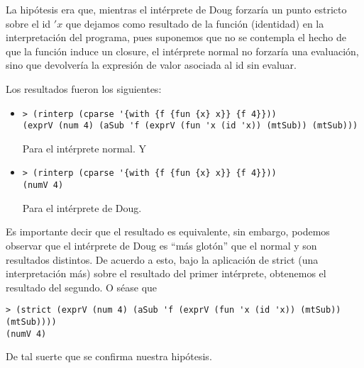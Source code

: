 \documentclass[12pt]{article}
\begin{document}
La hipótesis era que, mientras el intérprete de Doug forzaría un punto estricto sobre el id $'x$ que dejamos como resultado de la función
(identidad) en la interpretación del programa, pues suponemos que no se contempla el hecho de que la función induce un closure, el intérprete normal no forzaría una evaluación, sino que devolvería la expresión de valor asociada al id sin evaluar.\par
Los resultados fueron los siguientes:
\begin{itemize}
\item
\begin{verbatim}
> (rinterp (cparse '{with {f {fun {x} x}} {f 4}}))
(exprV (num 4) (aSub 'f (exprV (fun 'x (id 'x)) (mtSub)) (mtSub)))   
\end{verbatim}
Para el intérprete normal. Y
\item
\begin{verbatim}
> (rinterp (cparse '{with {f {fun {x} x}} {f 4}}))
(numV 4)
\end{verbatim}
Para el intérprete de Doug.
\end{itemize}
Es importante decir que el resultado es equivalente, sin embargo, podemos observar que el intérprete de Doug es ``más glotón'' que el normal
y son resultados distintos.
De acuerdo a esto, bajo la aplicación de strict (una interpretación más) sobre el resultado del primer intérprete, obtenemos el resultado del
segundo. O séase que
\begin{verbatim}
> (strict (exprV (num 4) (aSub 'f (exprV (fun 'x (id 'x)) (mtSub)) (mtSub))))
(numV 4)
\end{verbatim}
De tal suerte que se confirma nuestra hipótesis. 
\end{document}
